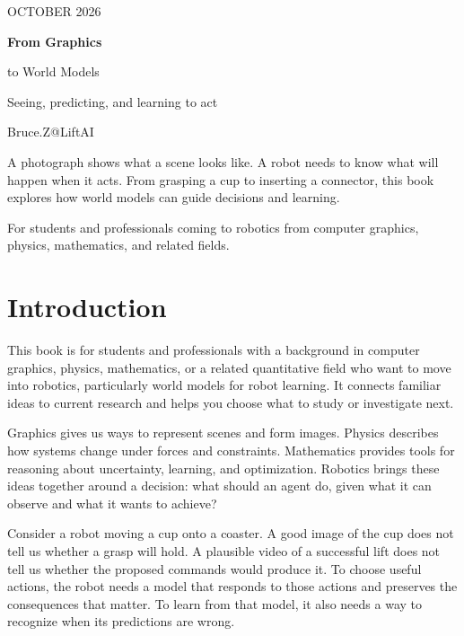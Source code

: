 \documentclass[11pt,a4paper,oneside]{report}
\begin{document}
\hypersetup{pageanchor=false}
\begin{titlepage}
\vspace*{12mm}
{\small\sffamily\color{accent}OCTOBER 2026\par}
\vspace{15mm}
{\Huge\bfseries\color{ink}From Graphics\par to World Models\par}
\vspace{9mm}
{\Large Seeing, predicting, and learning to act\par}
\vspace{6mm}
{\large Bruce.Z@LiftAI\par}
\vspace{10mm}

\vfill
\begin{minipage}{0.94\linewidth}
A photograph shows what a scene looks like. A robot needs to know what will happen when it acts. From grasping a cup to inserting a connector, this book explores how world models can guide decisions and learning.

For students and professionals coming to robotics from computer graphics, physics, mathematics, and related fields.
\end{minipage}
\end{titlepage}
\hypersetup{pageanchor=true}
\chapter*{Introduction}
This book is for students and professionals with a background in computer graphics, physics, mathematics, or a related quantitative field who want to move into robotics, particularly world models for robot learning. It connects familiar ideas to current research and helps you choose what to study or investigate next.

Graphics gives us ways to represent scenes and form images. Physics describes how systems change under forces and constraints. Mathematics provides tools for reasoning about uncertainty, learning, and optimization. Robotics brings these ideas together around a decision: what should an agent do, given what it can observe and what it wants to achieve?

Consider a robot moving a cup onto a coaster. A good image of the cup does not tell us whether a grasp will hold. A plausible video of a successful lift does not tell us whether the proposed commands would produce it. To choose useful actions, the robot needs a model that responds to those actions and preserves the consequences that matter. To learn from that model, it also needs a way to recognize when its predictions are wrong.
\end{document}
